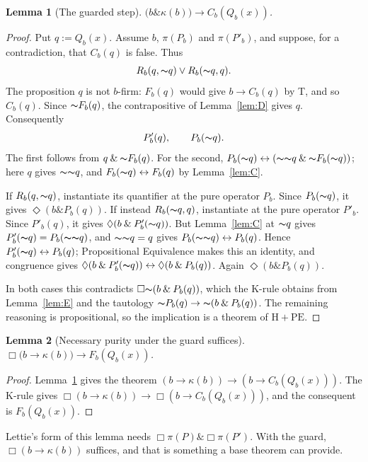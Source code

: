 \documentclass[12pt,leqno]{article}
\newcommand{\AND}{\ensuremath{\mathbin{\&}}}
\newcommand{\OR}{\ensuremath{\vee}}
\newcommand{\IFF}{\ensuremath{\leftrightarrow}}
\newcommand{\IC}{\ensuremath{\rightarrow}}
\newcommand{\NOT}{\ensuremath{\text{$\thicksim$}}}
\newcommand{\HPE}{\ensuremath{\mathrm{H}+\mathrm{PE}}}
\theoremstyle{plain}
\newtheorem{lemma}{Lemma}
\begin{document}
\begin{lemma}[The guarded step]\label{lem:guarded}
\(\bigl(b\AND\kappa(b)\bigr)\IC C_b(Q_b(x))\).
\end{lemma}
\begin{proof}
Put \(q:=Q_b(x)\). Assume \(b\), \(\pi(P_b)\) and \(\pi(P'_b)\), and
suppose, for a contradiction, that \(C_b(q)\) is false. Thus
\[
 R_b(q,\NOT q)\OR R_b(\NOT q,q).
\]
The proposition \(q\) is not \(b\)-firm: \(F_b(q)\) would give
\(b\IC C_b(q)\) by T, and so \(C_b(q)\). Since \(\NOT F_b(q)\), the
contrapositive of Lemma~\ref{lem:D} gives \(q\). Consequently
\[
 P'_b(q),\qquad P_b(\NOT q).
\]
The first follows from \(q\AND\NOT F_b(q)\). For the second,
\(P_b(\NOT q)\IFF(\NOT\NOT q\AND\NOT F_b(\NOT q))\); here \(q\) gives
\(\NOT\NOT q\), and \(F_b(\NOT q)\IFF F_b(q)\) by Lemma~\ref{lem:C}.

If \(R_b(q,\NOT q)\), instantiate its quantifier at the pure operator
\(P_b\). Since \(P_b(\NOT q)\), it gives \(\Diamond(b\AND P_b(q))\).
If instead \(R_b(\NOT q,q)\), instantiate at the pure operator
\(P'_b\). Since \(P'_b(q)\), it gives \(\Diamond(b\AND P'_b(\NOT q))\).
But Lemma~\ref{lem:C} at \(\NOT q\) gives
\(P'_b(\NOT q)=P_b(\NOT\NOT q)\), and \(\NOT\NOT q=q\) gives
\(P_b(\NOT\NOT q)\IFF P_b(q)\). Hence \(P'_b(\NOT q)\IFF P_b(q)\);
Propositional Equivalence makes this an identity, and congruence gives
\(\Diamond(b\AND P'_b(\NOT q))\IFF\Diamond(b\AND P_b(q))\). Again
\(\Diamond(b\AND P_b(q))\).

In both cases this contradicts \(\Box\NOT(b\AND P_b(q))\), which the
K-rule obtains from Lemma~\ref{lem:E} and the tautology
\(\NOT P_b(q)\IC\NOT(b\AND P_b(q))\). The remaining reasoning is
propositional, so the implication is a theorem of \HPE.
\end{proof}

\begin{lemma}[Necessary purity under the guard suffices]\label{lem:relative}
\(\Box\bigl(b\IC\kappa(b)\bigr)\IC F_b(Q_b(x))\).
\end{lemma}
\begin{proof}
Lemma~\ref{lem:guarded} gives the theorem
\((b\IC\kappa(b))\IC(b\IC C_b(Q_b(x)))\). The K-rule gives
\(\Box(b\IC\kappa(b))\IC\Box(b\IC C_b(Q_b(x)))\), and the consequent is
\(F_b(Q_b(x))\).
\end{proof}

Lettie's form of this lemma needs \(\Box\pi(P)\AND\Box\pi(P')\). With
the guard, \(\Box(b\IC\kappa(b))\) suffices, and that is something a base
theorem can provide.
\end{document}
